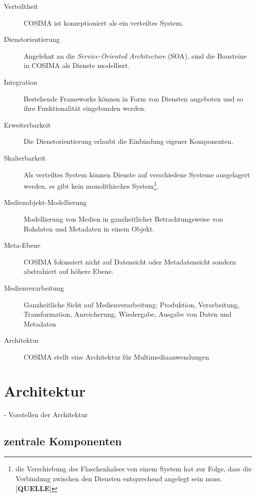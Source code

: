   \begin{description}
    \item[Verteiltheit] COSIMA ist konzeptioniert als ein verteiltes System.
    \item[Dienstorientierung] Angelehnt an die \emph{Service-Oriented Architecture} (SOA), sind die Bausteine in COSIMA als Dienste modelliert.
    \item[Integration] Bestehende Frameworks können in Form von Diensten angeboten und so ihre Funktionalität eingebunden werden.
    \item[Erweiterbarkeit] Die Dienstorientierung erlaubt die Einbindung eigener Komponenten.
    \item[Skalierbarkeit] Als verteiltes System können Dienste auf verschiedene Systeme ausgelagert werden, es gibt kein monolithisches System\footnote{die Verschiebung des Flaschenhalses von einem System hat zur Folge, dass die Verbindung zwischen den Diensten entsprechend angelegt sein muss. [\textbf{QUELLE}]}.
    \item[Medienobjekt-Modellierung] Modellierung von Medien in ganzheitlicher Betrachtungsweise von Rohdaten und Metadaten in einem Objekt.
    \item[Meta-Ebene] COSIMA fokussiert nicht auf Datensicht oder Metadatensicht sondern abstrahiert auf höhere Ebene.
    \item[Medienverarbeitung] Ganzheitliche Sicht auf Medienverarbeitung: Produktion, Verarbeitung, Transformation, Anreicherung, Wiedergabe, Ausgabe von Daten und Metadaten
    \item[Architektur] COSIMA stellt eine Architektur für Multimediaanwendungen
  \end{description}


\section{Architektur} %
\label{sec:architektur}

  - Vorstellen der Architektur
  
\subsection{zentrale Komponenten} %
\label{sub:zentrale_komponenten}

